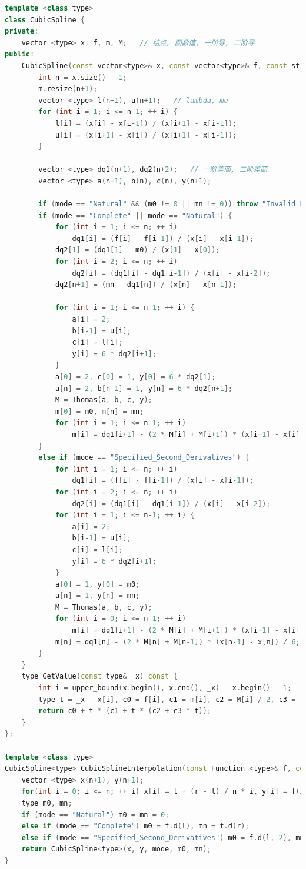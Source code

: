 \documentclass{ctexart}
\begin{document}
\begin{lstlisting}[language={c++}]
template <class type>
class CubicSpline {
private:
	vector <type> x, f, m, M;	// 结点, 函数值, 一阶导, 二阶导
public:
	CubicSpline(const vector<type>& x, const vector<type>& f, const string& mode = "Natural", const type& m0 = 0, const type& mn = 0) : x(x), f(f) {
		int n = x.size() - 1;
		m.resize(n+1);
		vector <type> l(n+1), u(n+1);	// lambda, mu
		for (int i = 1; i <= n-1; ++ i) {
			l[i] = (x[i] - x[i-1]) / (x[i+1] - x[i-1]);
			u[i] = (x[i+1] - x[i]) / (x[i+1] - x[i-1]);
		}

		vector <type> dq1(n+1), dq2(n+2);	// 一阶差商, 二阶差商
		vector <type> a(n+1), b(n), c(n), y(n+1);

		if (mode == "Natural" && (m0 != 0 || mn != 0)) throw "Invalid Parameter!";
		if (mode == "Complete" || mode == "Natural") {
			for (int i = 1; i <= n; ++ i)
				dq1[i] = (f[i] - f[i-1]) / (x[i] - x[i-1]);
			dq2[1] = (dq1[1] - m0) / (x[1] - x[0]);
			for (int i = 2; i <= n; ++ i)
				dq2[i] = (dq1[i] - dq1[i-1]) / (x[i] - x[i-2]);
			dq2[n+1] = (mn - dq1[n]) / (x[n] - x[n-1]);

			for (int i = 1; i <= n-1; ++ i) {
				a[i] = 2;
				b[i-1] = u[i];
				c[i] = l[i];
				y[i] = 6 * dq2[i+1];
			}
			a[0] = 2, c[0] = 1, y[0] = 6 * dq2[1];
			a[n] = 2, b[n-1] = 1, y[n] = 6 * dq2[n+1];
			M = Thomas(a, b, c, y);
			m[0] = m0, m[n] = mn;
			for (int i = 1; i <= n-1; ++ i)
				m[i] = dq1[i+1] - (2 * M[i] + M[i+1]) * (x[i+1] - x[i]) / 6;
		}
		else if (mode == "Specified_Second_Derivatives") {
			for (int i = 1; i <= n; ++ i)
				dq1[i] = (f[i] - f[i-1]) / (x[i] - x[i-1]);
			for (int i = 2; i <= n; ++ i)
				dq2[i] = (dq1[i] - dq1[i-1]) / (x[i] - x[i-2]);
			for (int i = 1; i <= n-1; ++ i) {
				a[i] = 2;
				b[i-1] = u[i];
				c[i] = l[i];
				y[i] = 6 * dq2[i+1];
			}
			a[0] = 1, y[0] = m0;
			a[n] = 1, y[n] = mn;
			M = Thomas(a, b, c, y);
			for (int i = 0; i <= n-1; ++ i)
				m[i] = dq1[i+1] - (2 * M[i] + M[i+1]) * (x[i+1] - x[i]) / 6;
			m[n] = dq1[n] - (2 * M[n] + M[n-1]) * (x[n-1] - x[n]) / 6;
		}
	}
	type GetValue(const type& _x) const {
		int i = upper_bound(x.begin(), x.end(), _x) - x.begin() - 1;
		type t = _x - x[i], c0 = f[i], c1 = m[i], c2 = M[i] / 2, c3 = (M[i+1] - M[i]) / (x[i+1] - x[i]) / 6;
		return c0 + t * (c1 + t * (c2 + c3 * t));
	}
};

template <class type>
CubicSpline<type> CubicSplineInterpolation(const Function <type>& f, const type& l, const type& r, const int& n, const string& mode = "Natural") {
	vector <type> x(n+1), y(n+1);
	for(int i = 0; i <= n; ++ i) x[i] = l + (r - l) / n * i, y[i] = f(x[i]);
	type m0, mn;
	if (mode == "Natural") m0 = mn = 0;
	else if (mode == "Complete") m0 = f.d(l), mn = f.d(r);
	else if (mode == "Specified_Second_Derivatives") m0 = f.d(l, 2), mn = f.d(r, 2);
	return CubicSpline<type>(x, y, mode, m0, mn);
}
\end{lstlisting}
\end{document}
